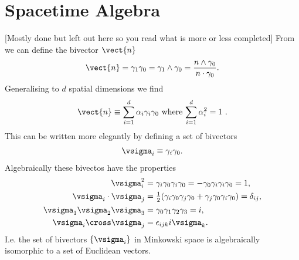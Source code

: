 



\section{Spacetime Algebra}\label{sec:spacetime_algebra}
[Mostly done but left out here so you read what is more or less completed]
From  we can define the bivector $\vect{n}$
\begin{align}
\vect{n} = \gamma_1\gamma_0  = \gamma_1\wedge\gamma_0= \frac{n\wedge\gamma_0}{n\cdot\gamma_0}.
\end{align}
Generalising to $d$ spatial dimensions we find 
\begin{align}
\vect{n} \equiv \sum_{i = 1}^d \alpha_i \gamma_i\gamma_0 \text{ where $\sum_{i = 1}^d \alpha_i^2 = 1$ }.
\end{align}
This can be written more elegantly by defining a set of bivectors
\begin{align}
\vsigma_i \equiv \gamma_i\gamma_0.
\end{align}
Algebraically these bivectos have the properties
\begin{align}
 \vsigma_i^2 &=  \gamma_i \gamma_0 \gamma_i \gamma_0 = -\gamma_0\gamma_i\gamma_i \gamma_0 = 1,\\
 \vsigma_i\cdot\vsigma_j &=  \tfrac{1}{2}(\gamma_i\gamma_0\gamma_j\gamma_0 + \gamma_j\gamma_0\gamma_i\gamma_0)=\delta_{ij},\\
 \vsigma_1\vsigma_2\vsigma_3 &= \gamma_0\gamma_1\gamma_2\gamma_3 = i,\\
 \vsigma_i\cross\vsigma_j &= \epsilon_{ijk}i \vsigma_k.
 \end{align}
I.e. the set of bivectors $\{\vsigma_i\}$ in Minkowski space is algebraically isomorphic to
a set of Euclidean vectors.



